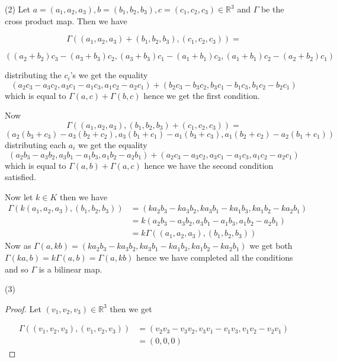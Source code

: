 \documentclass[letter,12pt]{article}
\newcommand{\R}{\mathbb{R}}
\begin{document}
(2) Let $a=(a_1,a_2,a_3),b=(b_1,b_2,b_3),c=(c_1,c_2,c_3)\in \R^3$ and $\Gamma$ be the cross product map. Then we have 

   \[ \Gamma((a_1,a_2,a_3)+(b_1,b_2,b_3),(c_1,c_2,c_3))=\]

   \[ ((a_2+b_2)c_3-(a_3+b_3)c_2,(a_3+b_3)c_1-(a_1+b_1)c_3,(a_1+b_1)c_2-(a_2+b_2)c_1)\]

   distributing the $c_i$'s we get the equality
   \[
    (a_2c_3-a_3c_2,a_3c_1-a_1c_3,a_1c_2-a_2c_1)+(b_2c_3-b_3c_2,b_3c_1-b_1c_3,b_1c_2-b_2c_1)
   \]
    which is equal to $\Gamma(a,c)+\Gamma(b,c)$ hence we get the first condition.

    Now 
    \[
        \Gamma((a_1,a_2,a_3),(b_1,b_2,b_3)+(c_1,c_2,c_3))=
    \]
    \[
        (a_2(b_3+c_3)-a_3(b_2+c_2),a_3(b_1+c_1)-a_1(b_3+c_3),a_1(b_2+c_2)-a_2(b_1+c_1))
    \]
    distributing each $a_i$ we get the equality
    \[
        (a_2b_3-a_3b_2,a_3b_1-a_1b_3,a_1b_2-a_2b_1)+(a_2c_3-a_3c_2,a_3c_1-a_1c_3,a_1c_2-a_2c_1)
    \]
    which is equal to $\Gamma(a,b)+\Gamma(a,c)$ hence we have the second condition satisfied.
    
    Now let $k\in K$  then we have 
    \begin{align}
        \Gamma(k(a_1,a_2,a_3),(b_1,b_2,b_3))&=  (ka_2b_3-ka_3b_2,ka_3b_1-ka_1b_3,ka_1b_2-ka_2b_1)\\
        &= k(a_2b_3-a_3b_2,a_3b_1-a_1b_3,a_1b_2-a_2b_1)\\
        &= k\Gamma((a_1,a_2,a_3),(b_1,b_2,b_3))
\end{align}
Now as $\Gamma(a,kb)=(ka_2b_3-ka_3b_2,ka_3b_1-ka_1b_3,ka_1b_2-ka_2b_1)$ we get both $\Gamma(ka,b)=k\Gamma(a,b)=\Gamma(a,kb)$ hence we have completed all the conditions and so $\Gamma$ is a bilinear map.
    

(3) 
\begin{proof}
    

Let $(v_1,v_2,v_3)\in \R^3$ then we get 

\begin{align*}
    \Gamma ((v_1,v_2,v_3),(v_1,v_2,v_3))&=(v_2v_3-v_3v_2,v_3v_1-v_1v_3,v_1v_2-v_2v_1)\\
    &= (0,0,0)
\end{align*}

\end{proof}
\end{document}
